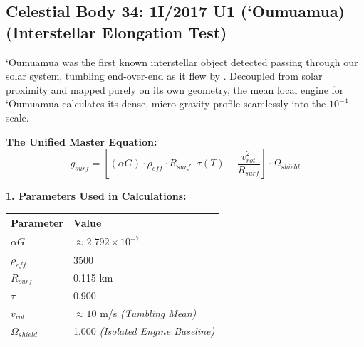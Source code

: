 \documentclass[11pt, a4paper]{article}
\begin{document}
\clearpage
\subsection{Celestial Body 34: 1I/2017 U1 (`Oumuamua) (Interstellar Elongation Test)}
  `Oumuamua was the first known interstellar object detected passing through our solar system, tumbling end-over-end as it flew by \cite{meech2017}. Decoupled from solar proximity and mapped purely on its own geometry, the mean local engine for `Oumuamua calculates its dense, micro-gravity profile seamlessly into the $10^{-4}$ scale.

  \vspace{0.5em}
  \noindent \textbf{The Unified Master Equation:}
  $$ g_{surf} = \left[ (\alpha G) \cdot \rho_{eff} \cdot R_{surf} \cdot \tau(T) - \frac{v_{rot}^2}{R_{surf}} \right] \cdot \Omega_{shield} $$

  \vspace{0.5em}
  \noindent \textbf{1. Parameters Used in Calculations:} \\[0.5em]
  \begingroup
  \renewcommand{\arraystretch}{1.3}
  \hspace*{2em}
  \begin{tabular}{|l|l|}
    \hline
    \textbf{Parameter} & \textbf{Value} \\ \hline
    $\alpha G$ & $\approx 2.792 \times 10^{-7}$ \\ \hline
    $\rho_{eff}$ & 3500 \\ \hline
    $R_{surf}$ & 0.115 km \\ \hline
    $\tau$ & 0.900 \\ \hline
    $v_{rot}$ & $\approx 10$ m/s \textit{(Tumbling Mean)} \\ \hline
    $\Omega_{shield}$ & 1.000 \textit{(Isolated Engine Baseline)} \\ \hline
  \end{tabular}
  \endgroup
\end{document}
